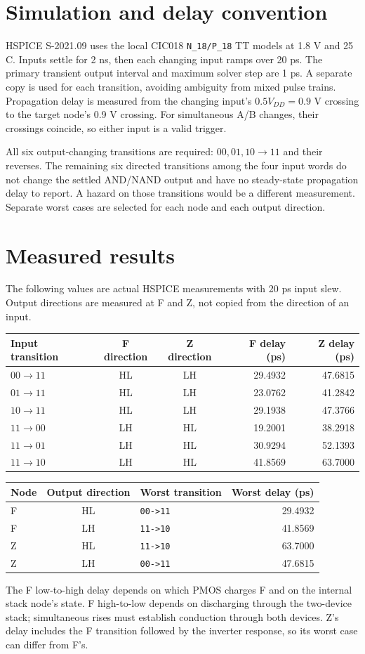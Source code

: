 \documentclass[11pt]{article}
\begin{document}
\section*{Simulation and delay convention}
HSPICE S-2021.09 uses the local CIC018 \texttt{N\_18/P\_18} TT models at 1.8 V and 25 C. Inputs settle for 2 ns, then each changing input ramps over 20 ps. The primary transient output interval and maximum solver step are 1 ps. A separate copy is used for each transition, avoiding ambiguity from mixed pulse trains. Propagation delay is measured from the changing input's $0.5V_{DD}=0.9$ V crossing to the target node's 0.9 V crossing. For simultaneous A/B changes, their crossings coincide, so either input is a valid trigger.

All six output-changing transitions are required: $00,01,10\to11$ and their reverses. The remaining six directed transitions among the four input words do not change the settled AND/NAND output and have no steady-state propagation delay to report. A hazard on those transitions would be a different measurement. Separate worst cases are selected for each node and each output direction.
\newpage\section*{Measured results}
The following values are actual HSPICE measurements with 20 ps input slew. Output directions are measured at F and Z, not copied from the direction of an input.
\begin{center}\begin{tabular}{lccrr}\toprule Input transition&F direction&Z direction&F delay (ps)&Z delay (ps)\\\midrule
$00\to 11$&HL&LH&29.4932&47.6815\\
$01\to 11$&HL&LH&23.0762&41.2842\\
$10\to 11$&HL&LH&29.1938&47.3766\\
$11\to 00$&LH&HL&19.2001&38.2918\\
$11\to 01$&LH&HL&30.9294&52.1393\\
$11\to 10$&LH&HL&41.8569&63.7000\\
\bottomrule\end{tabular}\end{center}
\begin{center}\begin{tabular}{lclr}\toprule Node&Output direction&Worst transition&Worst delay (ps)\\\midrule
F&HL&\texttt{00->11}&29.4932\\
F&LH&\texttt{11->10}&41.8569\\
Z&HL&\texttt{11->10}&63.7000\\
Z&LH&\texttt{00->11}&47.6815\\
\bottomrule\end{tabular}\end{center}
The F low-to-high delay depends on which PMOS charges F and on the internal stack node's state. F high-to-low depends on discharging through the two-device stack; simultaneous rises must establish conduction through both devices. Z's delay includes the F transition followed by the inverter response, so its worst case can differ from F's.
\end{document}
